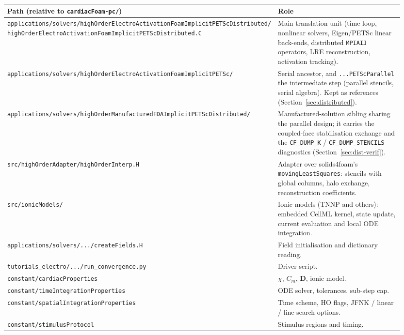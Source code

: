 \documentclass[11pt,a4paper]{article}
\newcommand{\code}[1]{\texttt{\small #1}}
\newcommand{\Dten}{\mathbf{D}}
\begin{document}
\begin{center}
\begin{tabular}{@{}p{0.55\linewidth}p{0.40\linewidth}@{}}
\toprule
Path (relative to \code{cardiacFoam-pc/}) & Role \\
\midrule
\code{applications/solvers/highOrderElectroActivationFoamImplicitPETScDistributed/}
   \code{highOrderElectroActivationFoamImplicitPETScDistributed.C}
   & Main translation unit (time loop, nonlinear solvers, Eigen/PETSc linear
   back-ends, distributed \code{MPIAIJ} operators, LRE reconstruction,
   activation tracking). \\
\code{applications/solvers/highOrderElectroActivationFoamImplicitPETSc/}
   & Serial ancestor, and \code{...PETScParallel} the intermediate step
   (parallel stencils, serial algebra). Kept as references
   (Section~\ref{sec:distributed}). \\
\code{applications/solvers/highOrderManufacturedFDAImplicitPETScDistributed/}
   & Manufactured-solution sibling sharing the parallel design; it carries the
   coupled-face stabilisation exchange and the \code{CF\_DUMP\_K} /
   \code{CF\_DUMP\_STENCILS} diagnostics (Section~\ref{sec:dist-verif}). \\
\code{src/highOrderAdapter/highOrderInterp.H} & Adapter over solids4foam's
   \code{movingLeastSquares}: stencils with global columns, halo exchange,
   reconstruction coefficients. \\
\code{src/ionicModels/} & Ionic models (TNNP and others): embedded CellML kernel,
   state update, current evaluation and local ODE integration. \\
\code{applications/solvers/.../createFields.H} & Field initialisation
   and dictionary reading. \\
\code{tutorials\_electro/.../run\_convergence.py} & Driver script. \\
\code{constant/cardiacProperties} & $\chi$, $C_{m}$, $\Dten$,
   ionic model. \\
\code{constant/timeIntegrationProperties} & ODE solver, tolerances,
   sub-step cap. \\
\code{constant/spatialIntegrationProperties} & Time scheme, HO flags,
   JFNK / linear / line-search options. \\
\code{constant/stimulusProtocol} & Stimulus regions and timing. \\
\bottomrule
\end{tabular}
\end{center}

\end{document}
